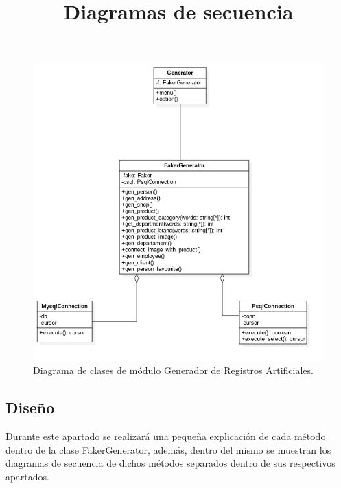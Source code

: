 \FloatBarrier
\begin{figure}[htbp!]
		\centering
			\includegraphics[width=.7 \textwidth]{imagenes/ClasesRuben/generador}
		\caption{Diagrama de clases de módulo Generador de Registros Artificiales.}
		\label{image:diagramaclasesGRA}
\end{figure}
\FloatBarrier

\subsection{Diseño}

\title{\textbf{Diagramas de secuencia\\}}
Durante este apartado se realizará una pequeña explicación de cada método dentro de la clase FakerGenerator, además, dentro del mismo se muestran los diagramas de secuencia de dichos métodos separados dentro de sus respectivos apartados. \\






